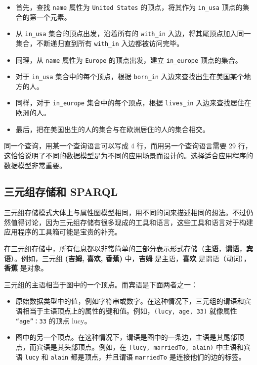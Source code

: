 \begin{itemize}
    \item 首先，查找 \texttt{name} 属性为 \texttt{United States} 的顶点，将其作为 \texttt{in\_usa} 顶点的集合的第一个元素。
    \item 从 \texttt{in\_usa} 集合的顶点出发，沿着所有的 \texttt{with\_in} 入边，将其尾顶点加入同一集合，不断递归直到所有 \texttt{with\_in} 入边都被访问完毕。
    \item 同理，从 \texttt{name} 属性为 \texttt{Europe} 的顶点出发，建立 \texttt{in\_europe} 顶点的集合。
    \item 对于 \texttt{in\_usa} 集合中的每个顶点，根据 \texttt{born\_in} 入边来查找出生在美国某个地方的人。
    \item 同样，对于 \texttt{in\_europe} 集合中的每个顶点，根据 \texttt{lives\_in} 入边来查找居住在欧洲的人。
    \item 最后，把在美国出生的人的集合与在欧洲居住的人的集合相交。
\end{itemize}

同一个查询，用某一个查询语言可以写成 4 行，而用另一个查询语言需要 29 行，这恰恰说明了不同的数据模型是为不同的应用场景而设计的。选择适合应用程序的数据模型非常重要。

\subsection{三元组存储和 SPARQL}

三元组存储模式大体上与属性图模型相同，用不同的词来描述相同的想法。不过仍然值得讨论，因为三元组存储有很多现成的工具和语言，这些工具和语言对于构建应用程序的工具箱可能是宝贵的补充。

在三元组存储中，所有信息都以非常简单的三部分表示形式存储（\textbf{主语}，\textbf{谓语}，\textbf{宾语}）。例如，三元组 \textbf{(吉姆, 喜欢, 香蕉)} 中，\textbf{吉姆} 是主语，\textbf{喜欢} 是谓语（动词），\textbf{香蕉} 是对象。

三元组的主语相当于图中的一个顶点。而宾语是下面两者之一：

\begin{itemize}
    \item 原始数据类型中的值，例如字符串或数字。在这种情况下，三元组的谓语和宾语相当于主语顶点上的属性的键和值。例如，\texttt{(lucy, age, 33)} 就像属性 \texttt{{“age”：33}} 的顶点 lucy。
    \item 图中的另一个顶点。在这种情况下，谓语是图中的一条边，主语是其尾部顶点，而宾语是其头部顶点。例如，在 \texttt{(lucy, marriedTo, alain)} 中主语和宾语 \texttt{lucy} 和 \texttt{alain} 都是顶点，并且谓语 \texttt{marriedTo} 是连接他们的边的标签。    
\end{itemize}


